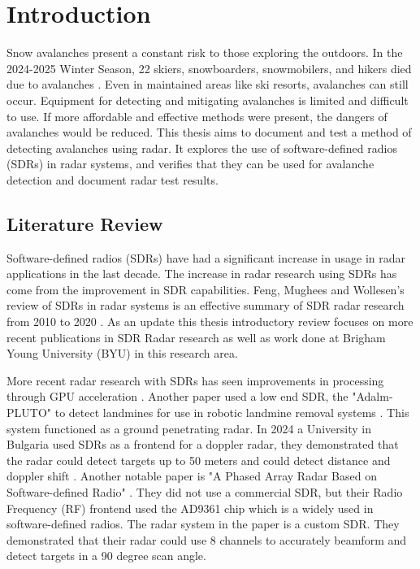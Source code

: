 \chapter{Introduction}
\label{ch:intro}

Snow avalanches present a constant risk to those exploring the outdoors.
In the 2024-2025 Winter Season, 22 skiers, snowboarders, snowmobilers, and hikers died due to avalanches \cite{noauthor_avalancheorg_nodate}.
Even in maintained areas like ski resorts, avalanches can still occur.
Equipment for detecting and mitigating avalanches is limited and difficult to use.
If more affordable and effective methods were present, the dangers of avalanches would be reduced.
This thesis aims to document and test a method of detecting avalanches using radar.
It explores the use of software-defined radios (SDRs) in radar systems,
and verifies that they can be used for avalanche detection and document radar test results.


\section{Literature Review}
\label{sec:literature_review}

Software-defined radios (SDRs) have had a significant increase in usage in radar applications in the last decade.
The increase in radar research using SDRs has come from the improvement in SDR capabilities.
Feng, Mughees and Wollesen's review of SDRs in radar systems is an effective summary of SDR radar research from 2010 to 2020  \cite{feng_reviewing_2020}.
As an update this thesis introductory review focuses on more recent publications in SDR Radar research
as well as work done at Brigham Young University (BYU) in this research area.

More recent radar research with SDRs has seen improvements in processing through GPU acceleration \cite{li_design_2022}.
Another paper used a low end SDR, the "Adalm-PLUTO" to detect landmines for use in robotic landmine removal systems \cite{bossi_versatile_2022}.
This system functioned as a ground penetrating radar.
In 2024 a University in Bulgaria used SDRs as a frontend for a doppler radar,
they demonstrated that the radar could detect targets up to 50 meters and could detect distance and doppler shift \cite{ivanov_design_2024}.
Another notable paper is "A Phased Array Radar Based on Software-defined Radio" \cite{chen_phased_2025}.
They did not use a commercial SDR, but their Radio Frequency (RF) frontend used the AD9361 chip which is a widely used in software-defined radios.
The radar system in the paper is a custom SDR.
They demonstrated that their radar could use 8 channels to accurately beamform
and detect targets in a 90 degree scan angle.


